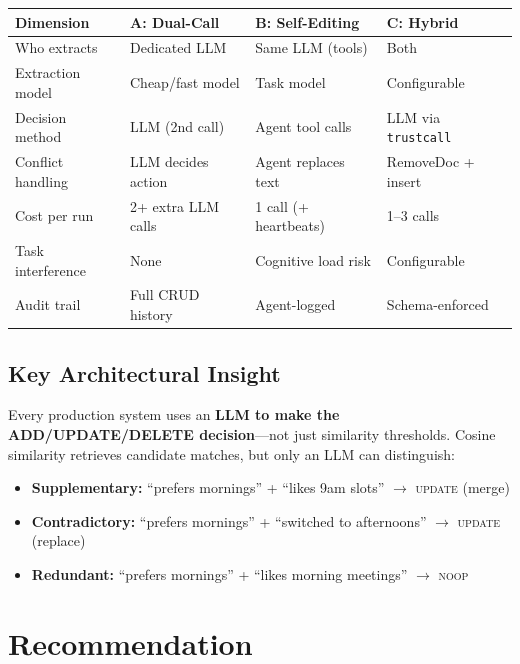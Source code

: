 \documentclass[11pt, letterpaper]{article}
\begin{document}
\begin{table}[h]
\centering
\small
\begin{tabularx}{\textwidth}{lXXX}
\toprule
\textbf{Dimension} & \textbf{A: Dual-Call} & \textbf{B: Self-Editing} & \textbf{C: Hybrid} \\
\midrule
Who extracts & Dedicated LLM & Same LLM (tools) & Both \\
Extraction model & Cheap/fast model & Task model & Configurable \\
Decision method & LLM (2nd call) & Agent tool calls & LLM via \texttt{trustcall} \\
Conflict handling & LLM decides action & Agent replaces text & RemoveDoc + insert \\
Cost per run & 2+ extra LLM calls & 1 call (+ heartbeats) & 1--3 calls \\
Task interference & None & Cognitive load risk & Configurable \\
Audit trail & Full CRUD history & Agent-logged & Schema-enforced \\
\bottomrule
\end{tabularx}
\end{table}

\subsection{Key Architectural Insight}

Every production system uses an \textbf{LLM to make the ADD/UPDATE/DELETE decision}---not
just similarity thresholds. Cosine similarity retrieves candidate matches, but only an
LLM can distinguish:

\begin{itemize}[leftmargin=2em]
    \item \textbf{Supplementary:} ``prefers mornings'' + ``likes 9am slots''
          $\rightarrow$ \textsc{update} (merge)
    \item \textbf{Contradictory:} ``prefers mornings'' + ``switched to afternoons''
          $\rightarrow$ \textsc{update} (replace)
    \item \textbf{Redundant:} ``prefers mornings'' + ``likes morning meetings''
          $\rightarrow$ \textsc{noop}
\end{itemize}

\section{Recommendation}
\end{document}
